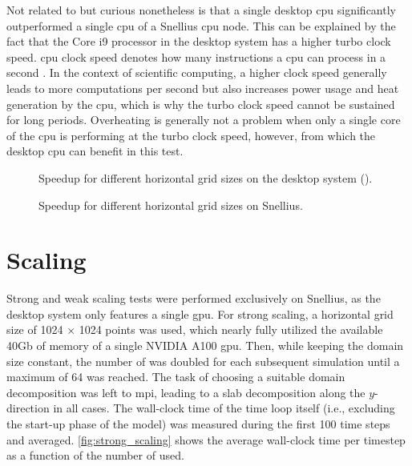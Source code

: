 Not related to  but curious nonetheless is that a single desktop \acrshort{cpu} significantly outperformed a single \acrshort{cpu} of a Snellius \acrshort{cpu} node. This can be explained by the fact that the Core i9 processor in the desktop system has a higher turbo clock speed. \acrshort{cpu} clock speed denotes how many instructions a \acrshort{cpu} can process in a second \citep{rauberParallelProgrammingMulticore2023}. In the context of scientific computing, a higher clock speed generally leads to more computations per second but also increases power usage and heat generation by the \acrshort{cpu}, which is why the turbo clock speed cannot be sustained for long periods. Overheating is generally not a problem when only a single core of the \acrshort{cpu} is performing at the turbo clock speed, however, from which the desktop \acrshort{cpu} can benefit in this test.

\begin{figure}[h!]
    \centering
    
    \caption{Speedup for different horizontal grid sizes on the desktop system ().}
    \label{fig:speedup_desktop}
\end{figure}

\begin{figure}[h!]
    \centering
    
    \caption{Speedup for different horizontal grid sizes on Snellius.}
    \label{fig:speedup_snellius}
\end{figure}

\section{Scaling}
Strong and weak scaling tests were performed exclusively on Snellius, as the desktop system only features a single \acrshort{gpu}. For strong scaling, a horizontal grid size of 1024 $\times$ 1024 points was used, which nearly fully utilized the available 40Gb of memory of a single NVIDIA A100 \acrshort{gpu}. Then, while keeping the domain size constant, the number of  was doubled for each subsequent simulation until a maximum of 64  was reached. The task of choosing a suitable domain decomposition was left to \acrshort{mpi}, leading to a slab decomposition along the $y$-direction in all cases. The wall-clock time of the time loop itself (i.e., excluding the start-up phase of the model) was measured during the first 100 time steps and averaged. \autoref{fig:strong_scaling} shows the average wall-clock time per timestep as a function of the number of  used. 

